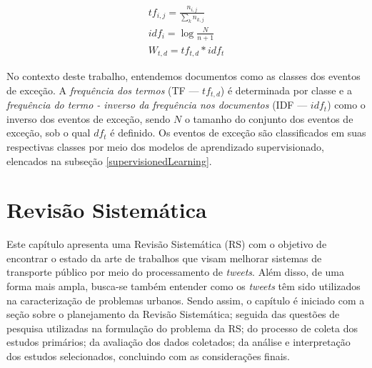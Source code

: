 \documentclass[
	12pt,				%
	oneside,			%
	a4paper,			%
	english,			%
	brazil				%
	]{abntex2ppgsi}
\begin{document}
\begin{equation}
\begin{split}
tf_{i,j} = \frac{n_{i,j}}{\sum_k n_{k,j}}
\\
idf_i = \log \frac{N}{n + 1}
\\
W_{t,d} = tf_{t,d} * idf_t
\end{split}
\end{equation}

No contexto deste trabalho, entendemos documentos como as classes dos eventos de exceção. A \emph{frequência dos termos} (TF --- $tf_{t,d}$) é determinada por classe e a \emph{frequência do termo - inverso da frequência nos documentos} (IDF --- $idf_t $) como o inverso dos eventos de exceção, sendo $N$ o tamanho do conjunto dos eventos de exceção, sob o qual $df_t$ é definido. Os eventos de exceção são classificados em suas respectivas classes por meio dos modelos de aprendizado supervisionado, elencados na subseção \ref{supervisionedLearning}. 


\chapter{Revisão Sistemática}
\label{revisao}
Este capítulo apresenta uma Revisão Sistemática (RS) com o objetivo de encontrar o estado da arte de trabalhos que visam melhorar sistemas de transporte público por meio do processamento de \textit{tweets}. Além disso, de uma forma mais ampla, busca-se também entender como os \textit{tweets} têm sido utilizados na caracterização de problemas urbanos. Sendo assim, o capítulo é iniciado com a seção sobre o planejamento da Revisão Sistemática; seguida das questões de pesquisa utilizadas na formulação do problema da RS; do processo de coleta dos estudos primários; da avaliação dos dados coletados; da análise e interpretação dos estudos selecionados, concluindo com as considerações finais.

\end{document}
